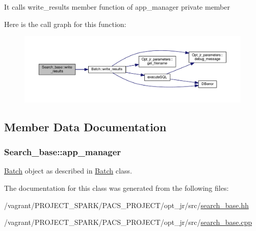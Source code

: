 It calls write\-\_\-results member function of app\-\_\-manager private member 

Here is the call graph for this function\-:
\nopagebreak
\begin{figure}[H]
\begin{center}
\leavevmode
\includegraphics[width=350pt]{classSearch__base_a43c7b22f332c3be3ed2f6da9e2d6d3a5_cgraph}
\end{center}
\end{figure}




\subsection{Member Data Documentation}
\hypertarget{classSearch__base_aee76f7ade36a2c78a486efa2715170ea}{
\subsubsection[{app\-\_\-manager}]{ Search\-\_\-base\-::app\-\_\-manager\hspace{0.3cm}{\ttfamily [protected]}}}\label{classSearch__base_aee76f7ade36a2c78a486efa2715170ea}


\hyperlink{classBatch}{Batch} object as described in \hyperlink{classBatch}{Batch} class. 



The documentation for this class was generated from the following files\-:\begin{DoxyCompactItemize}
\item 
/vagrant/\-P\-R\-O\-J\-E\-C\-T\-\_\-\-S\-P\-A\-R\-K/\-P\-A\-C\-S\-\_\-\-P\-R\-O\-J\-E\-C\-T/opt\-\_\-jr/src/\hyperlink{search__base_8hh}{search\-\_\-base.\-hh}\item 
/vagrant/\-P\-R\-O\-J\-E\-C\-T\-\_\-\-S\-P\-A\-R\-K/\-P\-A\-C\-S\-\_\-\-P\-R\-O\-J\-E\-C\-T/opt\-\_\-jr/src/\hyperlink{search__base_8cpp}{search\-\_\-base.\-cpp}\end{DoxyCompactItemize}
